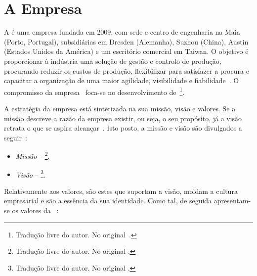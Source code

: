 \section{A Empresa}
\label{sec:chap02_company}
A {\companyname} é uma empresa fundada em 2009, com sede e centro de engenharia na Maia (Porto, Portugal), subsidiárias em Dresden (Alemanha), Suzhou (China), Austin (Estados Unidos da América) e um escritório comercial em Taiwan. O objetivo é proporcionar à indústria uma solução de gestão e controlo de produção, procurando reduzir os custos de produção, flexibilizar para satisfazer a procura e capacitar a organização de uma maior agilidade, visibilidade e fiabilidade~\parencite{cmf_overview}. O compromisso da empresa~\parencite{cmf_overview} foca-se no desenvolvimento de~\footnote{Tradução livre do autor. No original~.}.

A estratégia da empresa está sintetizada na sua missão, visão e valores. Se a missão descreve a razão da empresa existir, ou seja, o seu propósito, já a visão retrata o que se aspira alcançar~\parencite[pp.~65-66]{mission_vision_values_what_do_they_say}. Isto posto, a missão e visão são divulgados a seguir~\parencite{cmf_strategy}: 

\begin{itemize}
    \item 
    {
        \textit{Missão} -- \footnote{Tradução livre do autor. No original .}.
    }
    \item 
    {
        \textit{Visão} -- \footnote{Tradução livre do autor. No original .}.
    }
\end{itemize}

Relativamente aos valores, são estes que suportam a visão, moldam a cultura empresarial e são a essência da sua identidade. Como tal, de seguida apresentam-se os valores da {\companyname}~\parencite{cmf_strategy}:

